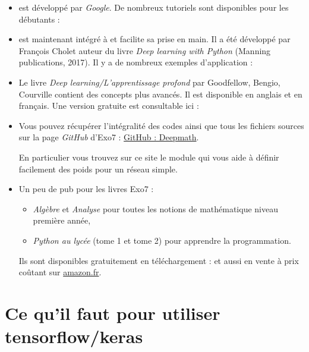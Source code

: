 \documentclass[11pt,class=report,crop=false]{standalone}
\begin{document}
\begin{itemize}
  \item \tensorflow{} est développé par \emph{Google}. De nombreux tutoriels sont disponibles pour les débutants :
  
  \item \keras{} est maintenant intégré à \tensorflow{} et facilite sa prise en main. 
  Il a été développé par François Cholet auteur du livre \emph{Deep learning with Python} (Manning publications, 2017). Il y a de nombreux exemples d'application :
  
  \item Le livre \emph{Deep learning/L'apprentissage profond} par Goodfellow, Bengio, Courville contient des concepts plus avancés. Il est disponible en anglais et en français. Une version gratuite est consultable ici :
 
  \item Vous pouvez récupérer l'intégralité des codes \Python{} ainsi que tous les fichiers sources sur la page \emph{GitHub} d'Exo7 :
  \href{https://github.com/exo7math/deepmath-exo7}{\og{}GitHub : Deepmath\fg{}}.
  
  En particulier vous trouvez sur ce site le module  qui vous aide à définir facilement des poids pour un réseau simple.
  
  
  
  \item Un peu de pub pour les livres Exo7 :  
  \begin{itemize}
    \item \emph{Algèbre} et \emph{Analyse} pour toutes les notions de mathématique niveau première année,
    \item \emph{Python au lycée} (tome 1 et tome 2) pour apprendre la programmation.
  \end{itemize}
  Ils sont disponibles gratuitement en téléchargement :
  et aussi en vente à prix coûtant sur \href{https://www.amazon.fr/}{amazon.fr}.
\end{itemize}



\section{Ce qu'il faut pour utiliser tensorflow/keras}
\end{document}
